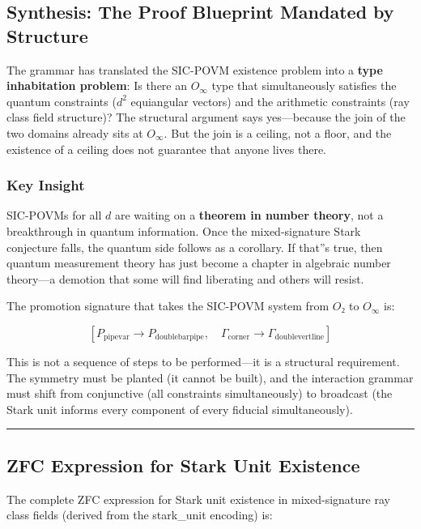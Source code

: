 \documentclass[12pt,a4paper]{article}
\begin{document}
\subsection{Synthesis: The Proof Blueprint Mandated by Structure}

The grammar has translated the SIC-POVM existence problem into a \textbf{type inhabitation problem}: Is there an $O_{\infty}$ type that simultaneously satisfies the quantum constraints ($d^2$ equiangular vectors) and the arithmetic constraints (ray class field structure)? The structural argument says yes---because the join of the two domains already sits at $O_{\infty}$. But the join is a ceiling, not a floor, and the existence of a ceiling does not guarantee that anyone lives there.

\subsubsection{Key Insight}

SIC-POVMs for all $d$ are waiting on a \textbf{theorem in number theory}, not a breakthrough in quantum information. Once the mixed-signature Stark conjecture falls, the quantum side follows as a corollary. If that''s true, then quantum measurement theory has just become a chapter in algebraic number theory---a demotion that some will find liberating and others will resist.

The promotion signature that takes the SIC-POVM system from $O₂$ to $O_{\infty}$ is:

\[[P_{\text{pipevar}} \rightarrow P_{\text{doublebarpipe}},\quad \Gamma_{\text{corner}} \rightarrow \Gamma_{\text{doublevertline}}]\]

This is not a sequence of steps to be performed---it is a structural requirement. The symmetry must be planted (it cannot be built), and the interaction grammar must shift from conjunctive (all constraints simultaneously) to broadcast (the Stark unit informs every component of every fiducial simultaneously).

\begin{center}
\rule{0.5\textwidth}{0.4pt}
\end{center}

\subsection{ZFC Expression for Stark Unit Existence}

The complete ZFC expression for Stark unit existence in mixed-signature ray class fields (derived from the stark\_unit encoding) is:
\end{document}
